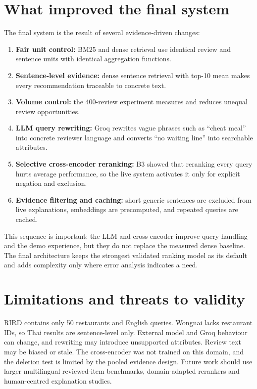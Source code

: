 \section{What improved the final system}
The final system is the result of several evidence-driven changes:
\begin{enumerate}
\item \textbf{Fair unit control:} BM25 and dense retrieval use identical review and sentence
units with identical aggregation functions.
\item \textbf{Sentence-level evidence:} dense sentence retrieval with top-10 mean makes every
recommendation traceable to concrete text.
\item \textbf{Volume control:} the 400-review experiment measures and reduces unequal review
opportunities.
\item \textbf{LLM query rewriting:} Groq rewrites vague phrases such as ``cheat meal'' into
concrete reviewer language and converts ``no waiting line'' into searchable attributes.
\item \textbf{Selective cross-encoder reranking:} B3 showed that reranking every query hurts
average performance, so the live system activates it only for explicit negation and exclusion.
\item \textbf{Evidence filtering and caching:} short generic sentences are excluded from live
explanations, embeddings are precomputed, and repeated queries are cached.
\end{enumerate}
This sequence is important: the LLM and cross-encoder improve query handling and the demo
experience, but they do not replace the measured dense baseline. The final architecture keeps
the strongest validated ranking model as its default and adds complexity only where error
analysis indicates a need.

\section{Limitations and threats to validity}
RIRD contains only 50 restaurants and English queries. Wongnai lacks restaurant IDs, so Thai
results are sentence-level only. External model and Groq behaviour can change, and rewriting
may introduce unsupported attributes. Review text may be biased or stale. The cross-encoder was
not trained on this domain, and the deletion test is limited by the pooled evidence design.
Future work should use larger multilingual reviewed-item benchmarks, domain-adapted rerankers and
human-centred explanation studies.
